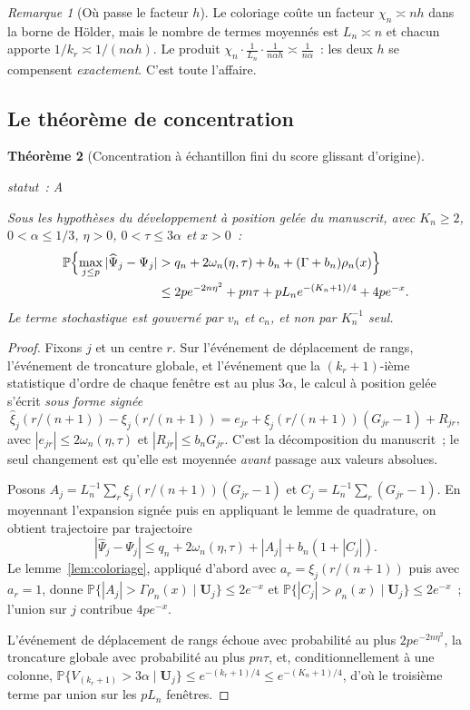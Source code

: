 \documentclass[11pt]{article}
\theoremstyle{plain}
\newtheorem{theoreme}{Théorème}[section]
\theoremstyle{definition}
\theoremstyle{remark}
\newtheorem{remarque}[theoreme]{Remarque}
\newcommand{\Pp}{\mathbb P}
\newcommand{\1}{\mathbf 1}
\newcommand{\statut}[1]{%
  \nopagebreak\par\nopagebreak
  \hfill{\normalfont\footnotesize\textcolor{gris}{statut~: #1}}%
  \par\nopagebreak\vspace{-2pt}}
\begin{document}
\begin{remarque}[Où passe le facteur $h$]
Le coloriage coûte un facteur $\chi_n\asymp nh$ dans la borne de Hölder,
mais le nombre de termes moyennés est $L_n\asymp n$ et chacun apporte
$1/k_r\asymp1/(n\alpha h)$. Le produit
$\chi_n\cdot\frac1{L_n}\cdot\frac1{n\alpha h}\asymp\frac{1}{n\alpha}$~:
les deux $h$ se compensent \emph{exactement}. C'est toute l'affaire.
\end{remarque}

\subsection{Le théorème de concentration}

\begin{theoreme}[Concentration à échantillon fini du score glissant d'origine]
\label{thm:score}
\statut{A}
Sous les hypothèses du développement à position gelée du manuscrit, avec
$K_n\ge2$, $0<\alpha\le1/3$, $\eta>0$, $0<\tau\le3\alpha$ et $x>0$~:
\begin{align*}
 \Pp\Bigl\{\max_{j\le p}|\widehat\Psi_j-\Psi_j|
 &>q_n+2\omega_n(\eta,\tau)+b_n+(\Gamma+b_n)\rho_n(x)\Bigr\}\\
 &\le 2pe^{-2n\eta^2}+pn\tau+pL_ne^{-(K_n+1)/4}+4pe^{-x} .
\end{align*}
Le terme stochastique est gouverné par $v_n$ et $c_n$, et \emph{non} par
$K_n^{-1}$ seul.
\end{theoreme}

\begin{proof}
Fixons $j$ et un centre $r$. Sur l'événement de déplacement de rangs,
l'événement de troncature globale, et l'événement que la
$(k_r+1)$-ième statistique d'ordre de chaque fenêtre est au plus
$3\alpha$, le calcul à position gelée s'écrit \emph{sous forme signée}
\[
 \widehat\xi_j(r/(n+1))-\xi_j(r/(n+1))
 =e_{jr}+\xi_j(r/(n+1))(G_{jr}-1)+R_{jr},
\]
avec $|e_{jr}|\le2\omega_n(\eta,\tau)$ et $|R_{jr}|\le b_nG_{jr}$. C'est
la décomposition du manuscrit~; le seul changement est qu'elle est
moyennée \emph{avant} passage aux valeurs absolues.

Posons
$A_j=L_n^{-1}\sum_r\xi_j(r/(n+1))(G_{jr}-1)$ et
$C_j=L_n^{-1}\sum_r(G_{jr}-1)$. En moyennant l'expansion signée puis en
appliquant le lemme de quadrature, on obtient trajectoire par
trajectoire
\[
 |\widehat\Psi_j-\Psi_j|\le q_n+2\omega_n(\eta,\tau)+|A_j|+b_n(1+|C_j|).
\]
Le lemme~\ref{lem:coloriage}, appliqué d'abord avec
$a_r=\xi_j(r/(n+1))$ puis avec $a_r=1$, donne
$\Pp\{|A_j|>\Gamma\rho_n(x)\mid\bm U_j\}\le2e^{-x}$ et
$\Pp\{|C_j|>\rho_n(x)\mid\bm U_j\}\le2e^{-x}$~; l'union sur $j$ contribue
$4pe^{-x}$.

L'événement de déplacement de rangs échoue avec probabilité au plus
$2pe^{-2n\eta^2}$, la troncature globale avec probabilité au plus
$pn\tau$, et, conditionnellement à une colonne,
$\Pp\{V_{(k_r+1)}>3\alpha\mid\bm U_j\}\le e^{-(k_r+1)/4}\le e^{-(K_n+1)/4}$,
d'où le troisième terme par union sur les $pL_n$ fenêtres.
\end{proof}
\end{document}
